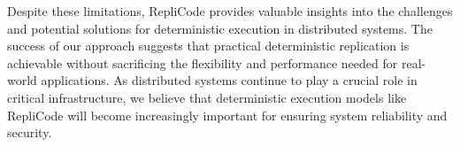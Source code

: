 \documentclass[10pt, 
]{IEEEtran}
\begin{document}
Despite these limitations, RepliCode provides valuable insights into the challenges and potential solutions for deterministic execution in distributed systems. The success of our approach suggests that practical deterministic replication is achievable without sacrificing the flexibility and performance needed for real-world applications. As distributed systems continue to play a crucial role in critical infrastructure, we believe that deterministic execution models like RepliCode will become increasingly important for ensuring system reliability and security.



\end{document}
